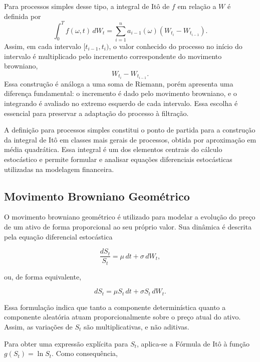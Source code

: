 Para processos simples desse tipo, a integral de Itô de $f$ em relação a
$W$ é definida por
\begin{equation}
\int_0^T f(\omega,t)\,dW_t
=
\sum_{i=1}^{n}
a_{i-1}(\omega)
\left(
W_{t_i}-W_{t_{i-1}}
\right).
\end{equation}
Assim, em cada intervalo $[t_{i-1},t_i)$, o valor conhecido do processo no
início do intervalo é multiplicado pelo incremento correspondente do
movimento browniano,
\begin{equation}
W_{t_i}-W_{t_{i-1}}.
\end{equation}
Essa construção é análoga a uma soma de Riemann, porém apresenta uma
diferença fundamental: o incremento é dado pelo movimento browniano, e o
integrando é avaliado no extremo esquerdo de cada intervalo. Essa escolha é
essencial para preservar a adaptação do processo à filtração.

A definição para processos simples constitui o ponto de partida para a
construção da integral de Itô em classes mais gerais de processos, obtida por
aproximação em média quadrática. Essa integral é um dos elementos centrais do
cálculo estocástico e permite formular e analisar equações diferenciais
estocásticas utilizadas na modelagem financeira.

\subsection{Movimento Browniano Geométrico}
O movimento browniano geométrico é utilizado para modelar a evolução do
preço de um ativo de forma proporcional ao seu próprio valor. Sua dinâmica
é descrita pela equação diferencial estocástica

\begin{equation}
\frac{dS_t}{S_t}
=
\mu\,dt
+
\sigma\,dW_t,
\end{equation}

ou, de forma equivalente,

\begin{equation}
dS_t
=
\mu S_t\,dt
+
\sigma S_t\,dW_t.
\end{equation}

Essa formulação indica que tanto a componente determinística quanto a
componente aleatória atuam proporcionalmente sobre o preço atual do ativo.
Assim, as variações de $S_t$ são multiplicativas, e não aditivas.

Para obter uma expressão explícita para $S_t$, aplica-se a Fórmula de Itô à
função $g(S_t)=\ln S_t$. Como consequência,

